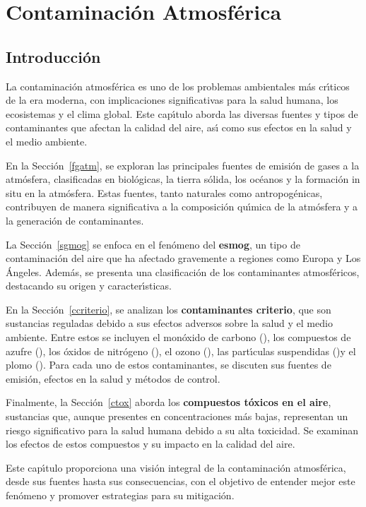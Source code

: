 \chapter{Contaminaci\'on Atmosf\'erica}
\section*{Introducci\'on}

La contaminaci\'on atmosf\'erica es uno de los problemas ambientales m\'as cr\'{\i}ticos de la era moderna, con implicaciones significativas para la salud humana, los ecosistemas y el clima global. Este cap\'{\i}tulo aborda las diversas fuentes y tipos de contaminantes que afectan la calidad del aire, as\'{\i} como sus efectos en la salud y el medio ambiente. 

En la Secci\'on~\ref{fgatm}, se exploran las principales fuentes de emisi\'on de gases a la atm\'osfera, clasificadas en biol\'ogicas, la tierra s\'olida, los oc\'eanos y la formaci\'on in situ en la atm\'osfera. Estas fuentes, tanto naturales como antropog\'enicas, contribuyen de manera significativa a la composici\'on qu\'{\i}mica de la atm\'osfera y a la generaci\'on de contaminantes.

La Secci\'on~\ref{sgmog} se enfoca en el fen\'omeno del \textbf{esmog}, un tipo de contaminaci\'on del aire que ha afectado gravemente a regiones como Europa y Los \'Angeles. Adem\'as, se presenta una clasificaci\'on de los contaminantes atmosf\'ericos, destacando su origen y caracter\'{\i}sticas.

En la Secci\'on~\ref{ccriterio}, se analizan los \textbf{contaminantes criterio}, que son sustancias reguladas debido a sus efectos adversos sobre la salud y el medio ambiente. Entre estos se incluyen el mon\'oxido de carbono (), los compuestos de azufre (), los \'oxidos de nitr\'ogeno (), el ozono (), las part\'{\i}culas suspendidas ()y el plomo (). Para cada uno de estos contaminantes, se discuten sus fuentes de emisi\'on, efectos en la salud y m\'etodos de control.

Finalmente, la Secci\'on~\ref{ctox} aborda los \textbf{compuestos t\'oxicos en el aire}, sustancias que, aunque presentes en concentraciones m\'as bajas, representan un riesgo significativo para la salud humana debido a su alta toxicidad. Se examinan los efectos de estos compuestos y su impacto en la calidad del aire.

Este cap\'{\i}tulo proporciona una visi\'on integral de la contaminaci\'on atmosf\'erica, desde sus fuentes hasta sus consecuencias, con el objetivo de entender mejor este fen\'omeno y promover estrategias para su mitigaci\'on.


